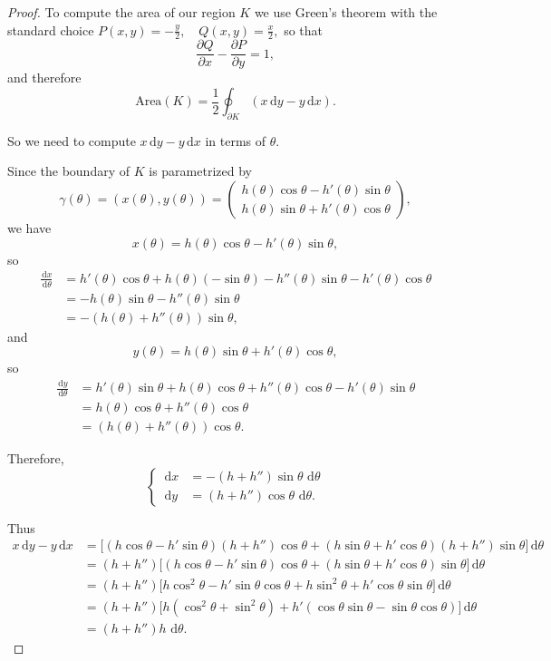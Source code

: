 \documentclass[11pt,letterpaper,reqno]{amsart}
\newcommand{\dd}{\,\mathrm{d}}
\begin{document}
\begin{explanation}
\begin{proof}

    To compute the area of our region $K$ we use Green's theorem with the standard choice
$P(x,y)=-\tfrac{y}{2},\quad Q(x,y)=\tfrac{x}{2},$
so that
\[
\frac{\partial Q}{\partial x}-\frac{\partial P}{\partial y}=1,
\]
and therefore
\[
\text{Area}(K)=\frac{1}{2}\oint_{\partial K}(x\dd y-y\dd x).
\]

So we need to compute $x\dd y-y\dd x$ in terms of $\theta$.

    Since the boundary of $K$ is parametrized by
\[
\gamma(\theta)=(x(\theta),y(\theta))=\begin{pmatrix}h(\theta)\cos\theta-h'(\theta)\sin\theta\\h(\theta)\sin\theta+h'(\theta)\cos\theta\end{pmatrix},
\]
we have
\[
x(\theta)=h(\theta)\cos\theta-h'(\theta)\sin\theta,
\]
so
\begin{align*}
\frac{\dd x}{\dd\theta}&=h'(\theta)\cos\theta+h(\theta)(-\sin\theta)-h''(\theta)\sin\theta-h'(\theta)\cos\theta\\
&=-h(\theta)\sin\theta-h''(\theta)\sin\theta\\
&=-(h(\theta)+h''(\theta))\sin\theta,
\end{align*}
and
\[
y(\theta)=h(\theta)\sin\theta+h'(\theta)\cos\theta,
\]
so
\begin{align*}
\frac{\dd y}{\dd\theta}&=h'(\theta)\sin\theta+h(\theta)\cos\theta+h''(\theta)\cos\theta-h'(\theta)\sin\theta\\
&=h(\theta)\cos\theta+h''(\theta)\cos\theta\\
&=(h(\theta)+h''(\theta))\cos\theta.
\end{align*}

Therefore,
\[
\left\{\begin{aligned}
\dd x&=-(h+h'')\sin\theta\,\dd\theta\\
 \dd y&=(h+h'')\cos\theta\,\dd\theta.
\end{aligned}\right.
\]

Thus
\begin{align*}
x\dd y-y\dd x&=\bigl[(h\cos\theta-h'\sin\theta)(h+h'')\cos\theta+(h\sin\theta+h'\cos\theta)(h+h'')\sin\theta\bigr]\dd\theta\\
&=(h+h'')\bigl[(h\cos\theta-h'\sin\theta)\cos\theta+(h\sin\theta+h'\cos\theta)\sin\theta\bigr]\dd\theta\\
&=(h+h'')\bigl[h\cos^2\theta-h'\sin\theta\cos\theta+h\sin^2\theta+h'\cos\theta\sin\theta\bigr]\dd\theta\\
&=(h+h'')\bigl[h(\cos^2\theta+\sin^2\theta)+h'(\cos\theta\sin\theta-\sin\theta\cos\theta)\bigr]\dd\theta\\
&=(h+h'')h\,\dd\theta.
\end{align*}


\end{proof}
\end{explanation}
\end{document}
